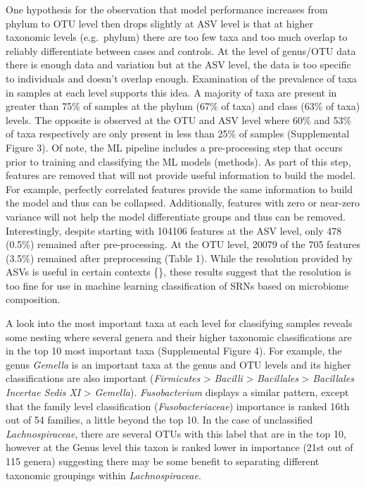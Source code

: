 \documentclass[
]{article}
\begin{document}
One hypothesis for the observation that model performance increases from
phylum to OTU level then drops slightly at ASV level is that at higher
taxonomic levels (e.g.~phylum) there are too few taxa and too much
overlap to reliably differentiate between cases and controls. At the
level of genus/OTU data there is enough data and variation but at the
ASV level, the data is too specific to individuals and doesn't overlap
enough. Examination of the prevalence of taxa in samples at each level
supports this idea. A majority of taxa are present in greater than 75\%
of samples at the phylum (67\% of taxa) and class (63\% of taxa) levels.
The opposite is observed at the OTU and ASV level where 60\% and 53\% of
taxa respectively are only present in less than 25\% of samples
(Supplemental Figure 3). Of note, the ML pipeline includes a
pre-processing step that occurs prior to training and classifying the ML
models (methods). As part of this step, features are removed that will
not provide useful information to build the model. For example,
perfectly correlated features provide the same information to build the
model and thus can be collapsed. Additionally, features with zero or
near-zero variance will not help the model differentiate groups and thus
can be removed. Interestingly, despite starting with 104106 features at
the ASV level, only 478 (0.5\%) remained after pre-processing. At the
OTU level, 20079 of the 705 features (3.5\%) remained after
preprocessing (Table 1). While the resolution provided by ASVs is useful
in certain contexts \{\}, these results suggest that the resolution is
too fine for use in machine learning classification of SRNs based on
microbiome composition.

A look into the most important taxa at each level for classifying
samples reveals some nesting where several genera and their higher
taxonomic classifications are in the top 10 most important taxa
(Supplemental Figure 4). For example, the genus \emph{Gemella} is an
important taxa at the genus and OTU levels and its higher
classifications are also important (\emph{Firmicutes} \textgreater{}
\emph{Bacilli} \textgreater{} \emph{Bacillales} \textgreater{}
\emph{Bacillales Incertae Sedis XI} \textgreater{} \emph{Gemella}).
\emph{Fusobacterium} displays a similar pattern, except that the family
level classification (\emph{Fusobacteriaceae}) importance is ranked 16th
out of 54 families, a little beyond the top 10. In the case of
unclassified \emph{Lachnospiraceae}, there are several OTUs with this
label that are in the top 10, however at the Genus level this taxon is
ranked lower in importance (21st out of 115 genera) suggesting there may
be some benefit to separating different taxonomic groupings within
\emph{Lachnospiraceae}.
\end{document}
